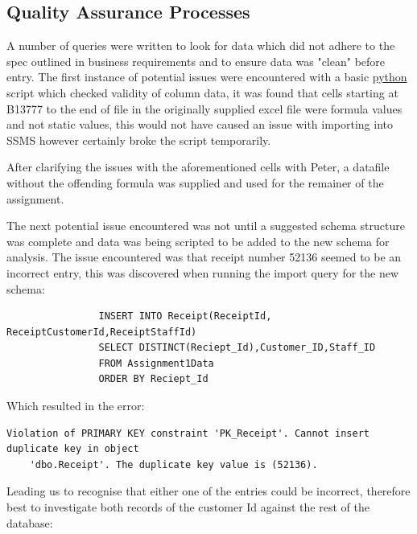 \documentclass{article}
\begin{document}
        \subsection{Quality Assurance Processes}
        \label{sec:QAP}
            A number of queries were written to look for data which did not adhere to the spec
            outlined in business requirements and to ensure data was "clean" before entry.
            The first instance of potential issues were encountered with a basic \hyperref[sec:Python]{\color{blue}python} script
            which checked validity of column data, it was found that cells starting at B13777
            to the end of file in the originally supplied excel file were formula values and 
            not static values, this would not have caused an issue with importing into SSMS 
            however certainly broke the script temporarily.
            \par
            After clarifying the issues with the aforementioned cells with Peter, a datafile without
            the offending formula was supplied and used for the remainer of the assignment.
            \vspace{5mm}
            \par\noindent
            The next potential issue encountered was not until a suggested schema structure 
            was complete and data was being scripted to be added to the new schema for analysis.
            The issue encountered was that receipt number 52136 seemed to be an incorrect 
            entry, this was discovered when running the import query for the new schema:

            \begin{lstlisting}
                INSERT INTO Receipt(ReceiptId, ReceiptCustomerId,ReceiptStaffId)
                SELECT DISTINCT(Reciept_Id),Customer_ID,Staff_ID
                FROM Assignment1Data
                ORDER BY Reciept_Id
            \end{lstlisting}

            Which resulted in the error:
            \color{red}
            \begin{Verbatim}[fontsize=\small]
    Violation of PRIMARY KEY constraint 'PK_Receipt'. Cannot insert duplicate key in object 
    'dbo.Receipt'. The duplicate key value is (52136).
            \end{Verbatim}
            \color{black}

            Leading us to recognise that either one of the entries could be incorrect, therefore
            best to investigate both records of the customer Id against the rest of the database:
\end{document}
